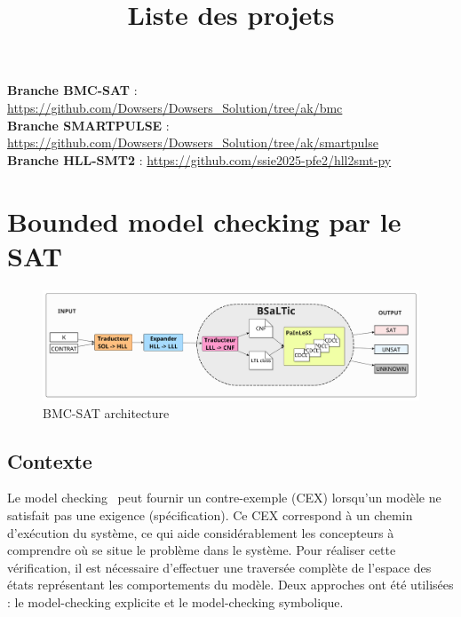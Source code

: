 \documentclass{article}
\title{Liste des projets}
\date{}
\begin{document}
\maketitle

\vspace{2cm}


\vspace{2cm}
{\large
\textbf{Branche BMC-SAT} : \url{https://github.com/Dowsers/Dowsers_Solution/tree/ak/bmc} \\
  
\textbf{Branche SMARTPULSE} : \url{https://github.com/Dowsers/Dowsers_Solution/tree/ak/smartpulse}\\


\textbf{Branche HLL-SMT2} : \url{https://github.com/ssie2025-pfe2/hll2smt-py}\\

  
}
\newpage
\section{Bounded model checking par le SAT}

\begin{figure}[h]
    \hspace{-0.8cm}
    \includegraphics[scale=0.28]{bsaltic_framework_solidity.pdf}
    \caption{BMC-SAT architecture}
    \label{fig:bmcsat}
\end{figure}
\subsection{Contexte}


Le model checking~\cite{modelchecking} peut fournir un contre-exemple (CEX) lorsqu'un modèle ne satisfait pas une exigence (spécification). Ce CEX correspond à un chemin d'exécution du système, ce qui aide considérablement les concepteurs à comprendre où se situe le problème dans le système.
%
Pour réaliser cette vérification, il est nécessaire d'effectuer une traversée complète de l'espace des états représentant les comportements du modèle. Deux approches ont été utilisées : le model-checking explicite et le model-checking symbolique.
\end{document}
